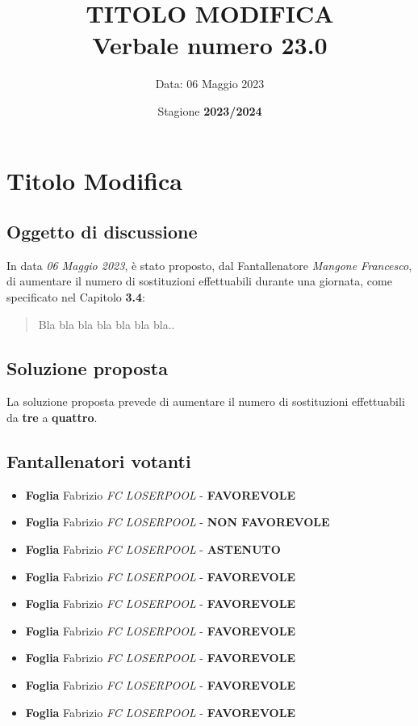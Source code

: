 \documentclass[12pt]{article}
\title{\textbf{\Huge TITOLO MODIFICA}\\Verbale numero 23.0}
\author{Data: 06 Maggio 2023}
\date{Stagione \textbf{2023/2024}}
\begin{document}
\maketitle
\thispagestyle{empty}

\newpage
\section*{Titolo Modifica}

\subsection*{Oggetto di discussione}
In data \textit{06 Maggio 2023}, è stato proposto, dal Fantallenatore \textit{Mangone Francesco}, di aumentare il numero di sostituzioni effettuabili durante una giornata, come specificato nel Capitolo \textbf{3.4}:
\begin{quote}
    Bla bla bla bla bla bla bla..
\end{quote}

\subsection*{Soluzione proposta}
La soluzione proposta prevede di aumentare il numero di sostituzioni effettuabili da \textbf{tre} a \textbf{quattro}.

\subsection*{Fantallenatori votanti}
\begin{itemize}
    \item \textbf{Foglia} Fabrizio \textit{FC LOSERPOOL} - \textbf{FAVOREVOLE}
    \item \textbf{Foglia} Fabrizio \textit{FC LOSERPOOL} - \textbf{NON FAVOREVOLE}
    \item \textbf{Foglia} Fabrizio \textit{FC LOSERPOOL} - \textbf{ASTENUTO}
    \item \textbf{Foglia} Fabrizio \textit{FC LOSERPOOL} - \textbf{FAVOREVOLE}
    \item \textbf{Foglia} Fabrizio \textit{FC LOSERPOOL} - \textbf{FAVOREVOLE}
    \item \textbf{Foglia} Fabrizio \textit{FC LOSERPOOL} - \textbf{FAVOREVOLE}
    \item \textbf{Foglia} Fabrizio \textit{FC LOSERPOOL} - \textbf{FAVOREVOLE}
    \item \textbf{Foglia} Fabrizio \textit{FC LOSERPOOL} - \textbf{FAVOREVOLE}
    \item \textbf{Foglia} Fabrizio \textit{FC LOSERPOOL} - \textbf{FAVOREVOLE}
\end{itemize}
\end{document}

